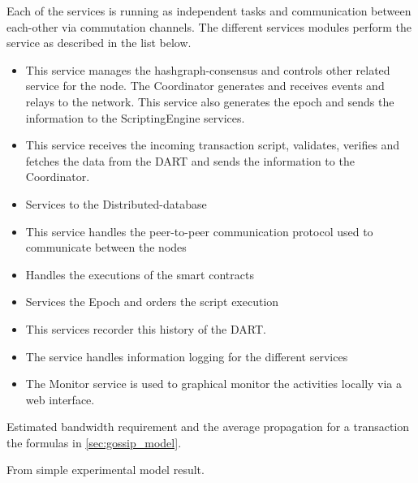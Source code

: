 Each of the services is running as independent tasks and communication between each-other via commutation channels. The different services modules perform the service as described in the list below.

\begin{itemize}
	\item[\bfit{Coordinator}] This service manages the hashgraph-consensus and controls other related service for the node. 
	The Coordinator generates and receives events and relays to the network. This service also generates the epoch and sends the information to the ScriptingEngine services.
	\item[\bfit{Transaction}] This service receives the incoming transaction script, validates, verifies and fetches the data from the DART and sends the information to the Coordinator.
	\item[\bfit{DART}] Services to the Distributed-database
	\item[\bfit{P2P}] This service handles the peer-to-peer communication protocol used to communicate between the nodes
	\item[\bfit{TVM}] Handles the executions of the smart contracts
	\item[\bfit{Transcript}] Services the Epoch and orders the script execution
	\item[\bfit{Recorder}] This services recorder this history of the DART.
	\item[\bfit{Logger}] The service handles information logging for the different services
	\item[\bfit{Monitor}] The Monitor service is used to graphical monitor the activities locally via a web interface.
\end{itemize}


Estimated bandwidth requirement and the average propagation for a transaction the formulas in \cref{sec:gossip_model}.
 
From simple experimental model result.\\

